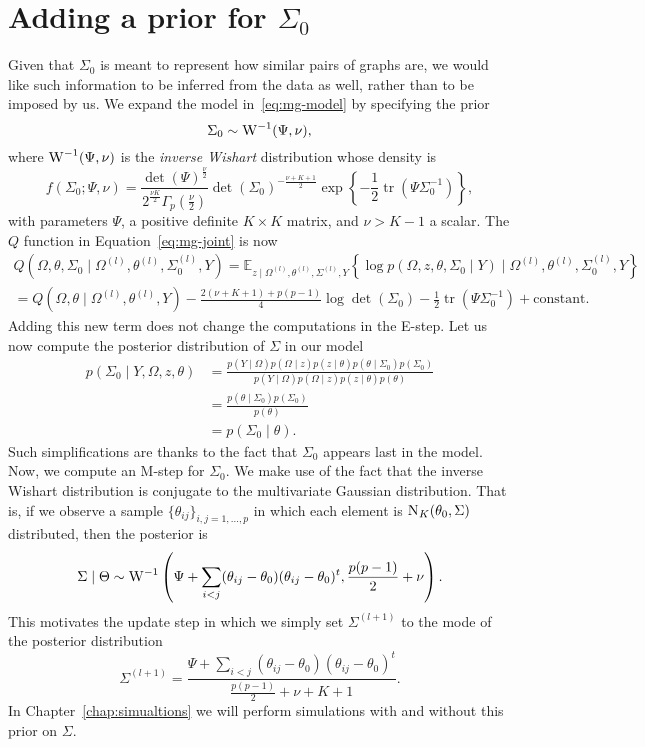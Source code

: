 \documentclass[a4paper, 11pt, oneside]{report}
\DeclareMathOperator{\tr}{tr}
\newcommand{\E}{\mathbb{E}}
\newcommand{\1}{\mathds{1}}
\newcommand{\powl}{^{(l)}}
\newcommand{\inv}{^{-1}}
\newcommand{\Nor}{\textsc{N}}
\begin{document}
\section{Adding a prior for $\Sigma_0$} %
Given that $\Sigma_0$ is meant to represent how similar pairs of graphs are,
we would like such information to be inferred from the data as well, rather than to be imposed by us.
We expand the model in~\eqref{eq:mg-model} by specifying the prior
\[\Sigma_0 \sim \textsc{W}\inv(\Psi, \nu),\]
where $\textsc{W}\inv(\Psi, \nu)$ is the \emph{inverse Wishart} distribution whose density is
\[f(\Sigma_0; \Psi, \nu) = \frac{\det(\Psi)^\frac{\nu}{2}}{2^\frac{\nu K}{2} \Gamma_p(\frac{\nu}{2})} \det(\Sigma_0)^{-\frac{\nu + K + 1}{2}} \exp\left\{-\frac{1}{2} \tr(\Psi \Sigma_0\inv)\right\},\]
with parameters $\Psi$, a positive definite $K \times K$ matrix, and $\nu > K - 1$ a scalar.
The $Q$ function in Equation~\eqref{eq:mg-joint} is now 
\begin{multline}
  Q\left(\Omega, \theta, \Sigma_0 \mid \Omega\powl, \theta\powl, \Sigma_0\powl, Y\right) =  \E_{z \mid
  \Omega\powl, \theta\powl, \Sigma\powl, Y}\left\{\log
	p(\Omega,  z, \theta, \Sigma_0 \mid Y) \mid
\Omega\powl, \theta\powl, \Sigma_0\powl, Y\right\}                    \\
                                              = Q\left(\Omega, \theta \mid \Omega\powl, \theta\powl, Y\right) - \frac{2(\nu + K + 1) + p(p-1)}{4} \log\det(\Sigma_0) - \frac{1}{2} \tr(\Psi \Sigma_0\inv) + \text{constant}.
\end{multline}
Adding this new term does not change the computations in the E-step. %
Let us now compute the posterior distribution of $\Sigma$ in our model
\begin{align*}
  p(\Sigma_0 \mid Y, \Omega, z, \theta) &= \frac{p(Y \mid \Omega) p(\Omega \mid z) p(z \mid \theta) p(\theta \mid \Sigma_0) p(\Sigma_0)}{p(Y \mid \Omega) p(\Omega \mid z) p(z \mid \theta) p(\theta)} \\
                                            &= \frac{p(\theta \mid \Sigma_0) p(\Sigma_0)}{p(\theta)} \\
                                            &= p(\Sigma_0 \mid \theta).
\end{align*}
Such simplifications are thanks to the fact that $\Sigma_0$ appears last in the model.
Now, we compute an M-step for $\Sigma_0$. 
We make use of the fact that the inverse Wishart distribution is conjugate to the multivariate Gaussian distribution.
That is, if we observe a sample $\{\theta_{ij}\}_{i,j=1,\dots,p}$ in which each element
is $\Nor_K (\theta_0, \Sigma)$ distributed, then the posterior is
\[\Sigma \mid \Theta \sim \textsc{W}\inv\left(\Psi + \sum_{i < j} (\theta_{ij} - \theta_0)(\theta_{ij} - \theta_0)^t , \frac{p(p-1)}{2} + \nu\right).\]
This motivates the update step in which we simply set $\Sigma^{(l+1)}$ to the mode of the posterior distribution
\[\Sigma^{(l+1)} = \frac{\Psi + \sum_{i < j} (\theta_{ij} - \theta_0)(\theta_{ij} - \theta_0)^t}{\frac{p(p-1)}{2} + \nu + K + 1}.\]
In Chapter~\ref{chap:simualtions} we will perform simulations with and without this prior on $\Sigma$.
\end{document}
